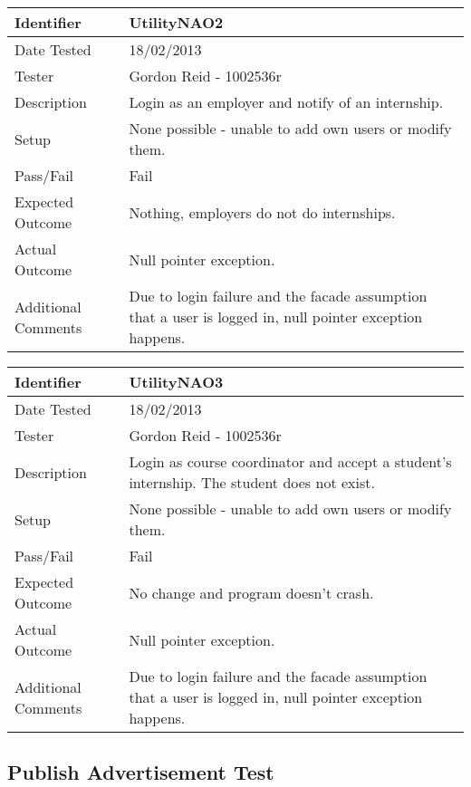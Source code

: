 \documentclass[11pt]{l3deliverable}
\begin{document}
\begin{tabularx}{\textwidth}{|T|L|}
\hline
Identifier & UtilityNAO2\\
\hline
Date Tested & 18/02/2013\\
\hline
Tester & Gordon Reid - 1002536r\\
\hline
Description & Login as an employer and notify of an internship.\\
\hline
Setup & None possible - unable to add own users or modify them.\\
\hline
Pass/Fail & Fail\\
\hline
Expected Outcome & Nothing, employers do not do internships.\\
\hline
Actual Outcome & Null pointer exception.\\
\hline
Additional Comments & Due to login failure and the facade assumption that a
user is logged in, null pointer exception happens.\\
\hline
\end{tabularx}

\vspace{2em}

\begin{tabularx}{\textwidth}{|T|L|}
\hline
Identifier & UtilityNAO3\\
\hline
Date Tested & 18/02/2013\\
\hline
Tester & Gordon Reid - 1002536r\\
\hline
Description & Login as course coordinator and accept a student's internship.
The student does not exist.\\
\hline
Setup & None possible - unable to add own users or modify them.\\
\hline
Pass/Fail & Fail\\
\hline
Expected Outcome & No change and program doesn't crash.\\
\hline
Actual Outcome & Null pointer exception.\\
\hline
Additional Comments & Due to login failure and the facade assumption that a
user is logged in, null pointer exception happens.\\
\hline
\end{tabularx}

\newpage

\subsection{Publish Advertisement Test}
\end{document}
